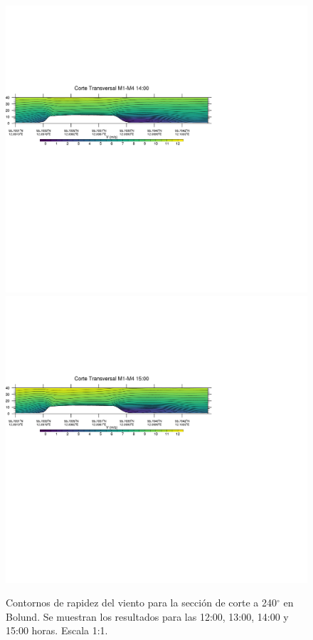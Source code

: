 \begin{figure}[H]
	\includegraphics[width=0.90\linewidth,trim={0mm 202.0mm 111mm 106mm},clip]{Imagenes/06/bol/1400rot}\\%
	\includegraphics[width=0.90\linewidth,trim={0mm 180.0mm 111mm 106mm},clip]{Imagenes/06/bol/1500rot}%
	\caption{Contornos de rapidez del viento para la sección de corte a 240$^\circ$ en Bolund. Se muestran los resultados para las 12:00, 13:00, 14:00 y 15:00 horas. Escala 1:1.}
	\label{fig:06_bol_cross}
\end{figure}

